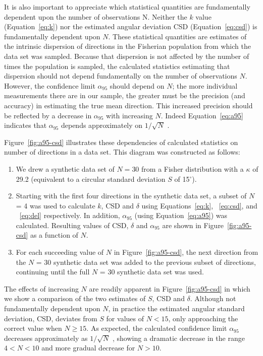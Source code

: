 It is also important to appreciate which statistical quantities are fundamentally dependent upon the
number of observations N. Neither the $k$ value (Equation~\ref{eq:k}) nor the estimated angular deviation CSD 
(Equation~\ref{eq:csd}) is fundamentally dependent upon $N$. These statistical quantities are estimates of
the intrinsic dispersion of directions in the Fisherian population from which the data set was sampled. Because
that dispersion is not affected by the number of times the population is sampled, the calculated
statistics estimating that dispersion should not depend fundamentally on the number of observations $N$.
However, the confidence limit $\alpha_{95}$  should depend on $N$; the more individual measurements there are in
our sample, the greater must be the precision (and accuracy) in estimating the true mean direction. This increased precision
should be reflected by a decrease in $\alpha_{95}$  with increasing $N$. Indeed Equation~\ref{eq:a95} indicates that $\alpha_{95}$ 
depends approximately on $1/ \sqrt{N}$ .

Figure~\ref{fig:a95-csd} illustrates these dependencies of calculated statistics on number of directions in a data set.   This diagram was constructed as follows:

\begin{enumerate}
\item We drew a synthetic data set of $N=30$ from a Fisher distribution with a $\kappa$ of 29.2 (equivalent to a circular standard deviation $S$ of 15$^{\circ}$). 
\item  Starting with the first four directions in the synthetic data set, a subset of $N$ = 4 was used to
calculate $k$,  CSD and $\delta$ using Equations~\ref{eq:k}, ~\ref{eq:csd}, and ~\ref{eq:del} respectively.   In
addition, $\alpha_{95}$ (using Equation~\ref{eq:a95}) was calculated. Resulting values of CSD, $\delta$ and $\alpha_{95}$ are shown in Figure~\ref{fig:a95-csd} as a function of $N$.  
\item For each succeeding value of $N $ in Figure~\ref{fig:a95-csd}, the next direction from the $N$ = 30 synthetic data set
was added to the previous subset of directions, continuing until the full $N$ = 30 synthetic data set was
used.
\end{enumerate}

The effects of increasing $N$ are readily apparent in Figure~\ref{fig:a95-csd} in which we show  a comparison of the two estimates of $S$, CSD and $\delta$.    
Although not fundamentally dependent
upon $N$, in practice the estimated angular standard deviation, CSD, deviates from  $S$ for values of $N < 15$, only approaching the correct value when  $N \ge 15$. As expected, the calculated confidence limit $\alpha_{95}$ decreases
approximately as $1 / \sqrt{N}$ , showing a dramatic decrease in the range $4 < N < 10 $ and more gradual decrease
for $N > 10$.   





